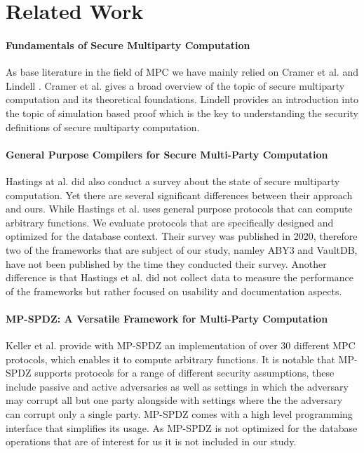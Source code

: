 \section {Related Work}
\paragraph{Fundamentals of Secure Multiparty Computation}
As base literature in the field of MPC we have mainly relied on Cramer et al.\cite{cramer2005multiparty} and Lindell \cite{lindell2017simulate}. Cramer et al. gives a broad overview of the topic of secure multiparty computation and its theoretical foundations. Lindell provides an introduction into the topic of simulation based proof which is the key to understanding the security definitions of secure multiparty computation.



\paragraph{ General Purpose Compilers for Secure Multi-Party Computation}
Hastings at al. \cite{hastings2019sok} did also conduct a survey about the state of secure multiparty computation. Yet there are several significant differences between their approach and ours. While Hastings et al. uses general purpose protocols that can compute arbitrary functions.  We evaluate protocols that are specifically designed and optimized for the database context. Their survey was published in 2020, therefore two of the frameworks that are subject of our study, namley ABY3 and VaultDB, have not been published by the time they conducted their survey. Another difference is that Hastings et al. did not collect data to measure the performance of the frameworks but rather focused on usability and documentation aspects.

\paragraph{MP-SPDZ: A Versatile Framework for Multi-Party Computation}
Keller et al. \cite{hastings2019sok} provide with MP-SPDZ an implementation of over 30 different MPC protocols, which enables it  to compute arbitrary functions. It is notable that MP-SPDZ supports protocols for a range of different security assumptions, these include passive and active adversaries as well as settings in which the adversary may corrupt all but one party alongside with settings where the the adversary can corrupt only a single party. MP-SPDZ comes with a high level programming interface that simplifies its usage. As MP-SPDZ is not optimized for the database operations that are of interest for us it is not included in our study. 